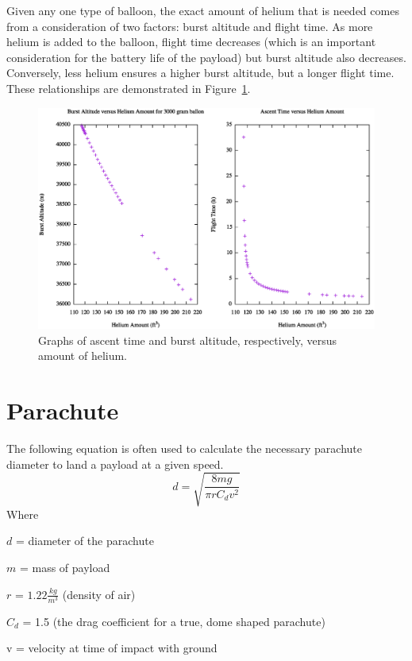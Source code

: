 \documentclass[english]{report}
\begin{document}
Given any one type of balloon, the exact amount of helium that is needed comes from a consideration of two factors: burst altitude and flight time.  As more helium is added to the balloon, flight time decreases (which is an important consideration for the battery life of the payload) but burst altitude also decreases. Conversely, less helium ensures a higher burst altitude, but a longer flight time.  These relationships are demonstrated in Figure~\ref{fig:heliumgraph}.

\begin{figure}[H]
\begin{centering}
\includegraphics[scale=0.5]{./graphs/heliumgraph}
\par\end{centering}
\caption{Graphs of ascent time and burst altitude, respectively, versus amount of helium.}
\label{fig:heliumgraph}
\end{figure}


\newpage
\section{Parachute}
\label{sec:parachute}
The following equation\cite{parachute-equation} is often used to calculate the necessary parachute diameter to land a payload at a given speed.
\begin{equation}
d = \sqrt{\frac{8mg}{\pi rC_dv^2}}
\label{eq:parachute_original}
\end{equation}
Where
\begin{description}
  \item $d$ = diameter of the parachute
  \item $m$ = mass of payload
  \item $r$ = $1.22\si{\frac{kg}{m^3}}$ (density of air)
  \item $C_d$ = 1.5 (the drag coefficient for a true, dome shaped parachute)
  \item v = velocity at time of impact with ground
\end{description}
\end{document}
